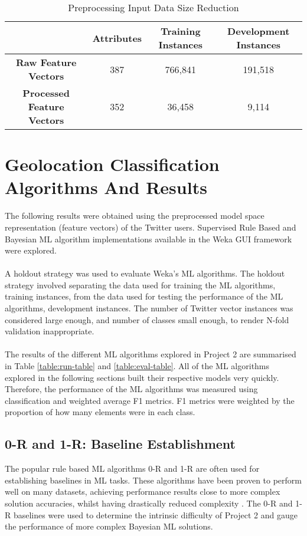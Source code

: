 \documentclass[11pt]{article}
\begin{document}
\begin{table} [th]
\caption{Preprocessing Input Data Size Reduction}
\centering
	\begin{tabular}{| c | c | c | c |}
	\hline
	 & \textbf{Attributes} & \textbf{Training Instances} & \textbf{Development Instances}  \\
	\hline
	\textbf{Raw Feature Vectors} & 387 & 766,841 & 191,518\\
	\hline
	\textbf{Processed Feature Vectors} & 352 & 36,458 & 9,114\\
	\hline
	\end{tabular}
\label{table:input-table}
\end{table}

\section{Geolocation Classification Algorithms And Results}

The following results were obtained using the preprocessed model space representation (feature vectors) of the Twitter users. Supervised Rule Based and Bayesian ML algorithm implementations available in the Weka GUI framework were explored. \\\\
A holdout strategy was used to evaluate Weka's ML algorithms. The holdout strategy involved separating the data used for training the ML algorithms, training instances, from the data used for testing the performance of the ML algorithms, development instances. The number of Twitter vector instances was considered large enough, and number of classes small enough, to render N-fold validation inappropriate.\\\\
The results of the different ML algorithms explored in Project 2 are summarised in Table \ref{table:run-table} and \ref{table:eval-table}. All of the ML algorithms explored in the following sections built their respective models very quickly. Therefore, the performance of the ML algorithms was measured using classification and weighted average F1 metrics. F1 metrics were weighted by the proportion of how many elements were in each class. 

\subsection{0-R and 1-R: Baseline Establishment}   

The popular rule based ML algorithms 0-R and 1-R are often used for establishing baselines in ML tasks. These algorithms have been proven to perform well on many datasets, achieving performance results close to more complex solution accuracies, whilst having drastically reduced complexity \cite{holte-1R}. The 0-R and 1-R baselines were used to determine the intrinsic difficulty of Project 2 and gauge the performance of more complex Bayesian ML solutions.
\end{document}
